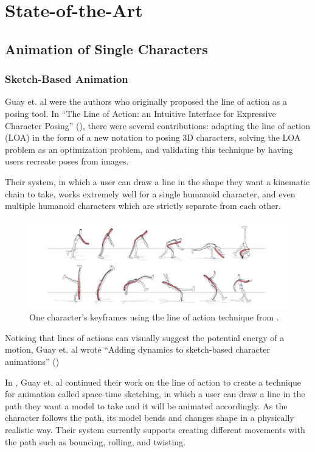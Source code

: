 \chapter{State-of-the-Art}\label{chap:sota}

\section{Animation of Single Characters}
\subsection{Sketch-Based Animation}
Guay et. al were the authors who originally proposed the line of action as a posing tool. In ``The Line of Action: an Intuitive Interface for Expressive Character Posing'' (\citep{guay2013line}), there were several contributions: adapting the line of action (LOA) in the form of a new notation to posing 3D characters, solving the LOA problem as an optimization problem, and validating this technique by having users recreate poses from images.

Their system, in which a user can draw a line in the shape they want a kinematic chain to take, works extremely well for a single humanoid character, and even multiple humanoid characters which are strictly separate from each other. 

\begin{figure}[!h]
\includegraphics[scale=0.4]{img/baseline}
\caption{One character's keyframes using the line of action technique from \citep{guay2013line}.}
\end{figure}

Noticing that lines of actions can visually suggest the potential energy of a motion, Guay et. al wrote ``Adding dynamics to sketch-based character animations'' (\citep{guay2015adding})

In \citep{guay2015space}, Guay et. al continued their work on the line of action to create a technique for animation called space-time sketching, in which a user can draw a line in the path they want a model to take and it will be animated accordingly. As the character follows the path, its model bends and changes shape in a physically realistic way. Their system currently supports creating different movements with the path such as bouncing, rolling, and twisting.

